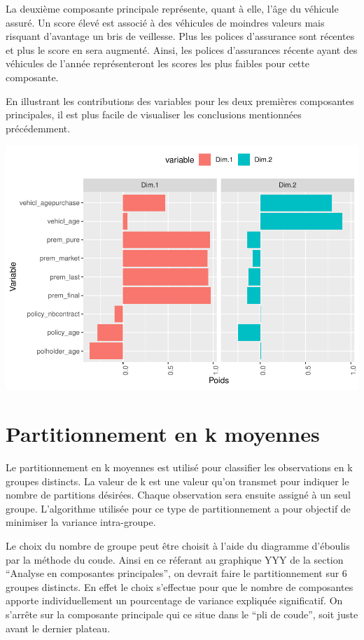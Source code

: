 \documentclass[
]{article}
\begin{document}
La deuxième composante principale représente, quant à elle, l'âge du
véhicule assuré. Un score élevé est associé à des véhicules de moindres
valeurs mais risquant d'avantage un bris de veillesse. Plus les polices
d'assurance sont récentes et plus le score en sera augmenté. Ainsi, les
polices d'assurances récente ayant des véhicules de l'année
représenteront les scores les plus faibles pour cette composante.

En illustrant les contributions des variables pour les deux premières
composantes principales, il est plus facile de visualiser les
conclusions mentionnées précédemment.

\includegraphics{01-01-Pretraitement_files/figure-latex/unnamed-chunk-5-1.pdf}

\newpage

\hypertarget{partitionnement-en-k-moyennes}{%
\section{Partitionnement en k
moyennes}\label{partitionnement-en-k-moyennes}}

Le partitionnement en k moyennes est utilisé pour classifier les
observations en k groupes distincts. La valeur de k est une valeur qu'on
transmet pour indiquer le nombre de partitions désirées. Chaque
observation sera ensuite assigné à un seul groupe. L'algorithme utilisée
pour ce type de partitionnement a pour objectif de minimiser la variance
intra-groupe.

Le choix du nombre de groupe peut être choisit à l'aide du diagramme
d'éboulis par la méthode du coude. Ainsi en ce réferant au graphique YYY
de la section ``Analyse en composantes principales'', on devrait faire
le partitionnement sur 6 groupes distincts. En effet le choix s'effectue
pour que le nombre de composantes apporte individuellement un
pourcentage de variance expliquée significatif. On s'arrête sur la
composante principale qui ce situe dans le ``pli de coude'', soit juste
avant le dernier plateau.
\end{document}
